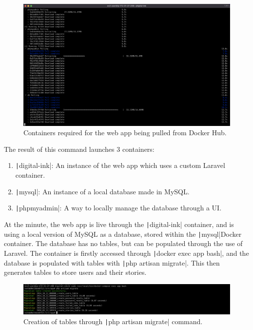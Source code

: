 \begin{figure}[!htbp]
    \centering
    \includegraphics[width=125mm]{resources/ec2/docker-compose}
    \caption{Containers required for the web app being pulled from Docker Hub.}
    \label{fig:webapp-docker-compose}
\end{figure}

The result of this command launches 3 containers:

\begin{enumerate}
    \item \texttt|digital-ink|: An instance of the web app which uses a custom Laravel container.
    \item \texttt|mysql|: An instance of a local database made in MySQL\@.
    \item \texttt|phpmyadmin|: A way to locally manage the database through a UI\@.
\end{enumerate}

\clearpage
At the minute, the web app is live through the \texttt|digital-ink| container, and is using a local version
of MySQL as a database, stored within the \texttt|mysql|Docker container.
The database has no tables, but can be populated through the use of Laravel.
The container is firstly accessed through \texttt|docker exec app bash|, and the database is populated with
tables with \texttt|php artisan migrate|.
This then generates tables to store users and their stories.

\begin{figure}[!htbp]
    \centering
    \includegraphics[width=\textwidth]{resources/ec2/php-artisan-migrate}
    \caption{Creation of tables through \texttt|php artisan migrate| command.}
    \label{fig:php-artisan-migrate}
\end{figure}

